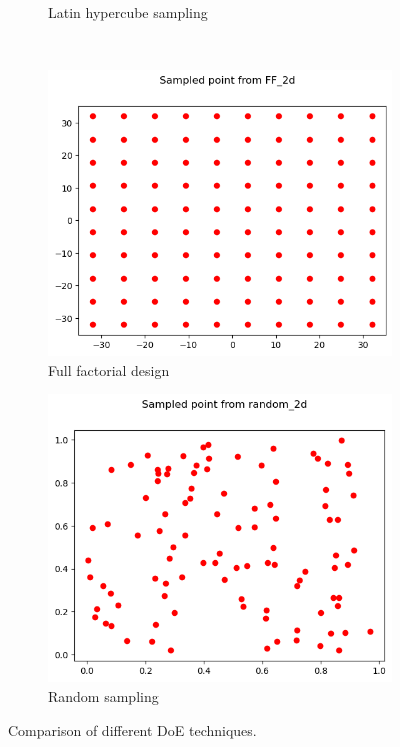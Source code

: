 \begin{figure}[H]
\begin{subfigure}{0.5\textwidth}
        \caption{Latin hypercube sampling}
    \end{subfigure}\\
    \begin{subfigure}{0.5\textwidth}
        \includegraphics[width=\textwidth]{lab9/imgs/ff.png}
        \caption{Full factorial design}
    \end{subfigure}
    \begin{subfigure}{0.5\textwidth}
        \includegraphics[width=\textwidth]{lab9/imgs/rand.png}
        \caption{Random sampling}
    \end{subfigure}
    \caption{Comparison of different DoE techniques.}
    \label{fig:doe-comp}
\end{figure}

